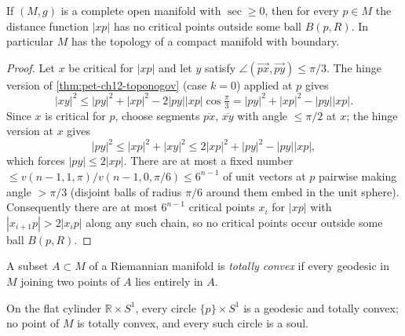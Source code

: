 \begin{lemma}
  \label{lem:pet-ch12-gromov-critical-point-estimate}
  If $(M,g)$ is a complete open manifold with $\sec\ge0$, then for every $p\in M$
  the distance function $|xp|$ has no critical points outside some ball
  $B(p,R)$. In particular $M$ has the topology of a compact manifold with
  boundary.
\end{lemma}
\begin{proof}
  Let $x$ be critical for $|xp|$ and let $y$ satisfy
  $\angle(\overrightarrow{px},\overrightarrow{py})\le\pi/3$. The hinge version
  of \cref{thm:pet-ch12-toponogov} (case $k=0$) applied at $p$ gives
  \[
    |xy|^2\le|py|^2+|xp|^2-2|py||xp|\cos\tfrac\pi3=|py|^2+|xp|^2-|py||xp|.
  \]
  Since $x$ is critical for $p$, choose segments $\overline{px}$,
  $\overline{xy}$ with angle $\le\pi/2$ at $x$; the hinge version at $x$ gives
  \[
    |py|^2\le|xp|^2+|xy|^2\le2|xp|^2+|py|^2-|py||xp|,
  \]
  which forces $|py|\le2|xp|$. There are at most a fixed number
  $\le v(n-1,1,\pi)/v(n-1,0,\pi/6)\le6^{n-1}$ of unit vectors at $p$ pairwise
  making angle $>\pi/3$ (disjoint balls of radius $\pi/6$ around them embed in
  the unit sphere). Consequently there are at most $6^{n-1}$ critical points
  $x_i$ for $|xp|$ with $|x_{i+1}p|>2|x_ip|$ along any such chain, so no critical
  points occur outside some ball $B(p,R)$.
\end{proof}

\begin{definition}
  \label{def:pet-ch12-totally-convex}
  A subset $A\subset M$ of a Riemannian manifold is \emph{totally convex} if
  every geodesic in $M$ joining two points of $A$ lies entirely in $A$.
\end{definition}

\begin{example}
  \label{ex:pet-ch12-totally-convex-cylinder}
  On the flat cylinder $\mathbb{R}\times S^1$, every circle $\{p\}\times S^1$ is
  a geodesic and totally convex; no point of $M$ is totally convex, and every
  such circle is a soul.
\end{example}


